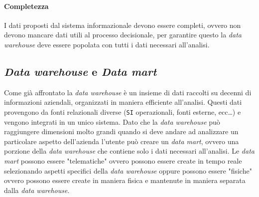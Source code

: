         \paragraph{Completezza} I dati proposti dal sistema informazionale devono essere completi, ovvero non devono mancare dati utili al processo decisionale, per garantire questo la \textit{data warehouse} deve essere popolata con tutti i dati necessari all'analisi.
    \subsection{\textit{Data warehouse} e \textit{Data mart}}
        Come già affrontato la \textit{data warehouse} è un insieme di dati raccolti su decenni di informazioni aziendali, organizzati in maniera efficiente all'analisi. Questi dati provengono da fonti relazionali diverse (\texttt{SI} operazionali, fonti esterne, ecc\dots) e vengono integrati in un unico sistema. Dato che la \textit{data warehouse} può raggiungere dimensioni molto grandi quando si deve andare ad analizzare un particolare aspetto dell'azienda l'utente può creare un \textit{data mart}, ovvero una porzione della \textit{data warehouse} che contiene solo i dati necessari all'analisi. Le \textit{data mart} possono essere "telematiche" ovvero possono essere create in tempo reale selezionando aspetti specifici della \textit{data warehouse} oppure possono essere "fisiche" ovvero possono essere create in maniera fisica e mantenute in maniera separata dalla \textit{data warehouse}.